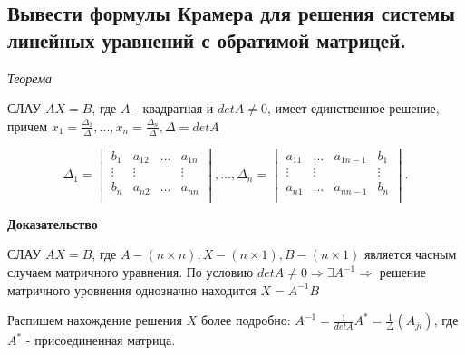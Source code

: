\ep

\subsection{Вывести формулы Крамера для решения системы линейных уравнений с обратимой матрицей.}

\textit {Теорема}

\vspace*{15pt}

СЛАУ $AX = B$, где $A$ - квадратная и $detA \ne 0$, имеет единственное решение, причем $x_1 = \frac{\Delta_1}{\Delta}, ..., x_n = \frac{\Delta_n}{\Delta}, \Delta = detA$

$$
\Delta_1 = 
\begin{vmatrix}
    b_1&a_{12}&\ldots&a_{1n}\\
    \vdots&\vdots&&\vdots\\
    b_n&a_{n2}&\ldots&a_{nn}\\
\end{vmatrix}, ..., 
\Delta_n = 
\begin{vmatrix}
    a_{11}&\ldots&a_{1n-1}&b_1\\
    \vdots&\vdots&&\vdots\\
    a_{n1}&\ldots&a_{nn-1}&b_n\\
\end{vmatrix}.
$$

\vspace*{15pt}



{\bf{Доказательство}}

СЛАУ $AX = B$, где $A - (n\times n), X - (n \times 1), B - (n \times 1)$ является часным случаем матричного уравнения. По условию $detA \ne 0 \Rightarrow \exists A^{-1} \Rightarrow$ решение матричного уровнения однозначно находится $X = A^{-1}B$

Распишем нахождение решения $X$ более подробно:
$A^{-1} = \frac{1}{detA}A^* = \frac{1}{\Delta}(A_{ji})$, где $A^*$ - присоединенная матрица.

